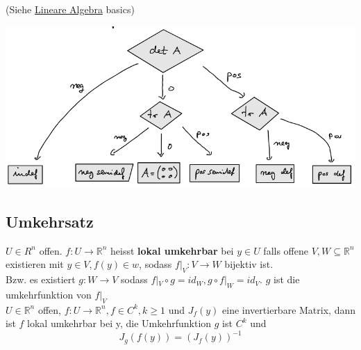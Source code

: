     (Siehe \href{#1.1}{Lineare Algebra} basics)\\
    \begin{minipage}{\linewidth}
      \includegraphics[width=\linewidth]{./sources/entscheidungsbaum-definitheit.png}
    \end{minipage}
\subsection{Umkehrsatz}
    $U\in R^n$ offen. $f:U\rightarrow\mathbb R^n$ heisst \textbf{lokal
    umkehrbar} bei $y\in U$ falls offene $V,W\subseteq\mathbb R^n$ existieren
    mit $y\in V, f(y)\in w$, sodass $f|_V:V\rightarrow W$ bijektiv ist.\\
    Bzw. es existiert $g:W\rightarrow V$ sodass $f|_V\circ g=id_W, g\circ
    f|_W=id_V$. $g$ ist die umkehrfunktion von $f|_V$\\
  $U\in\mathbb R^n$ offen, $f:U\rightarrow\mathbb R^n, f\in C^k, k\geq1$ und
  $J_f(y)$ eine invertierbare Matrix, dann ist $f$ lokal umkehrbar bei y, die
  Umkehrfunktion $g$ ist $C^k$ und $$J_g(f(y))=(J_f(y))^{-1}$$


